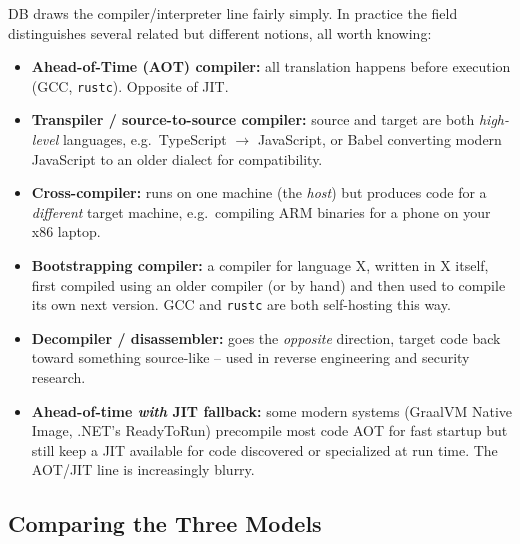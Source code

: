 \documentclass[11pt]{article}
\begin{document}
\begin{enrichment}
DB draws the compiler/interpreter line fairly simply. In practice the field distinguishes several
related but different notions, all worth knowing:
\begin{itemize}
  \item \textbf{Ahead-of-Time (AOT) compiler:} all translation happens before execution (GCC,
  \texttt{rustc}). Opposite of JIT.
  \item \textbf{Transpiler / source-to-source compiler:} source and target are both
  \emph{high-level} languages, e.g.\ TypeScript $\to$ JavaScript, or Babel converting modern
  JavaScript to an older dialect for compatibility.
  \item \textbf{Cross-compiler:} runs on one machine (the \emph{host}) but produces code for a
  \emph{different} target machine, e.g.\ compiling ARM binaries for a phone on your x86 laptop.
  \item \textbf{Bootstrapping compiler:} a compiler for language X, written in X itself, first
  compiled using an older compiler (or by hand) and then used to compile its own next version.
  GCC and \texttt{rustc} are both self-hosting this way.
  \item \textbf{Decompiler / disassembler:} goes the \emph{opposite} direction, target code back
  toward something source-like -- used in reverse engineering and security research.
  \item \textbf{Ahead-of-time \emph{with} JIT fallback:} some modern systems (GraalVM
  Native Image, .NET's ReadyToRun) precompile most code AOT for fast startup but still keep a
  JIT available for code discovered or specialized at run time. The AOT/JIT line is
  increasingly blurry.
\end{itemize}
\end{enrichment}

\subsection{Comparing the Three Models}
\end{document}
